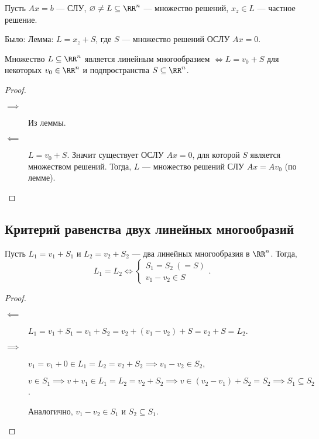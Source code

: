 Пусть $Ax = b$ --- СЛУ, $\varnothing \neq L \subseteq \RR^n$ --- множество решений, $x_z \in L$ --- частное решение.

Было: Лемма: $L = x_z + S$, где $S$ --- множество решений ОСЛУ $Ax = 0$.

\begin{proposal}
    Множество $L \subseteq \RR^n$ является линейным многообразием $\iff L = v_0 + S$ для некоторых $v_0 \in \RR^n$ и подпространства $S \subseteq \RR^n$. 
\end{proposal}

\begin{proof}~
    \begin{description}
    \item[$\implies$] Из леммы.
    \item[$\impliedby$] $L = v_0 + S$. Значит существует ОСЛУ $Ax = 0$, для которой $S$ является множеством решений. Тогда, $L$ --- множество решений СЛУ $Ax = Av_0$ (по лемме).
        \qedhere
    \end{description}
\end{proof}


\subsection{Критерий равенства двух линейных многообразий}

\begin{proposal}
    Пусть $L_1 = v_1 + S_1$ и $L_2 = v_2 + S_2$ --- два линейных многообразия в $\RR^n$. Тогда,
    \begin{equation*}
        L_1 = L_2 \iff \begin{cases}
            S_1 = S_2 \ (= S) \\
            v_1 - v_2 \in S
        \end{cases}
    .\end{equation*}
\end{proposal}

\begin{proof}~
    \begin{description}
    \item[$\impliedby$] 
        $L_1 = v_1 + S_1 = v_1 + S_2 = v_2 + (v_1 - v_2) + S = v_2 + S = L_2$.
    \item[$\implies$]
        $v_1 = v_1 + 0 \in L_1 = L_2 = v_2 + S_2 \implies v_1 - v_2 \in S_2$,

        $v \in S_1 \implies v + v_1 \in L_1 = L_2 = v_2 + S_2 \implies v \in (v_2 - v_1) + S_2 = S_2 \implies S_1 \subseteq S_2$.

        Аналогично, $v_1 - v_2 \in S_1$ и $S_2 \subseteq S_1$.
        \qedhere
    \end{description}
\end{proof}


